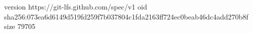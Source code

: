 version https://git-lfs.github.com/spec/v1
oid sha256:073ea6d6149d519fd259f7b037804c1fda2163ff724ec0beab46dc4add270b8f
size 79705
